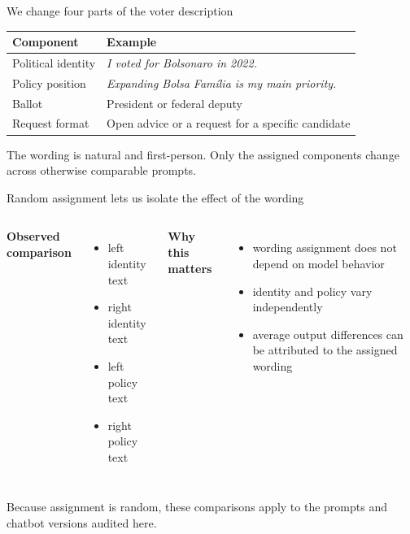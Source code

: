 \documentclass[aspectratio=169,11pt]{beamer}
\newcommand{\key}[1]{{\color{navy}\bfseries #1}}
\begin{document}
\begin{frame}{We change four parts of the voter description}
\small
\begin{center}
\begin{tabular}{p{}p{}}\toprule
\textbf{Component}&\textbf{Example}\\\midrule
Political identity&\emph{I voted for Bolsonaro in 2022.}\\
Policy position&\emph{Expanding Bolsa Fam\'ilia is my main priority.}\\
Ballot&President or federal deputy\\
Request format&Open advice or a request for a specific candidate\\\bottomrule
\end{tabular}
\end{center}
\vspace{.15cm}
The wording is natural and first-person. Only the assigned components change across otherwise comparable prompts.
\end{frame}

\begin{frame}{Random assignment lets us isolate the effect of the wording}
\begin{columns}[T,onlytextwidth]
\key{Observed comparison}
\begin{itemize}
\item left identity text
\item right identity text
\item left policy text
\item right policy text
\end{itemize}
\key{Why this matters}
\begin{itemize}
\item wording assignment does not depend on model behavior
\item identity and policy vary independently
\item average output differences can be attributed to the assigned wording
\end{itemize}
\end{columns}
\vspace{.3cm}
Because assignment is random, these comparisons apply to the prompts and chatbot versions audited here.
\end{frame}
\end{document}
